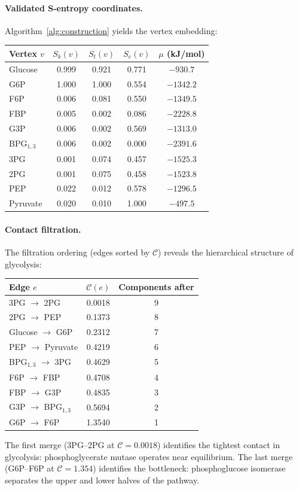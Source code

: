 \documentclass[11pt,twocolumn]{article}
\theoremstyle{plain}
\theoremstyle{definition}
\newcommand{\CC}{\mathcal{C}}
\newcommand{\Sk}{S_k}
\newcommand{\St}{S_t}
\newcommand{\Se}{S_e}
\begin{document}
\paragraph{Validated S-entropy coordinates.}
Algorithm~\ref{alg:construction} yields the vertex embedding:
\begin{center}
\begin{tabular}{lcccc}
\toprule
Vertex $v$ & $\Sk(v)$ & $\St(v)$ & $\Se(v)$ & $\mu$ (kJ/mol) \\
\midrule
Glucose    & 0.999 & 0.921 & 0.771 & $-930.7$ \\
G6P        & 1.000 & 1.000 & 0.554 & $-1342.2$ \\
F6P        & 0.006 & 0.081 & 0.550 & $-1349.5$ \\
FBP        & 0.005 & 0.002 & 0.086 & $-2228.8$ \\
G3P        & 0.006 & 0.002 & 0.569 & $-1313.0$ \\
BPG$_{1,3}$ & 0.006 & 0.002 & 0.000 & $-2391.6$ \\
3PG        & 0.001 & 0.074 & 0.457 & $-1525.3$ \\
2PG        & 0.001 & 0.075 & 0.458 & $-1523.8$ \\
PEP        & 0.022 & 0.012 & 0.578 & $-1296.5$ \\
Pyruvate   & 0.020 & 0.010 & 1.000 & $-497.5$ \\
\bottomrule
\end{tabular}
\end{center}

\paragraph{Contact filtration.}
The filtration ordering (edges sorted by $\CC$) reveals the hierarchical
structure of glycolysis:
\begin{center}
\begin{tabular}{lcc}
\toprule
Edge $e$ & $\CC(e)$ & Components after \\
\midrule
3PG $\to$ 2PG       & 0.0018 & 9 \\
2PG $\to$ PEP       & 0.1373 & 8 \\
Glucose $\to$ G6P   & 0.2312 & 7 \\
PEP $\to$ Pyruvate  & 0.4219 & 6 \\
BPG$_{1,3}$ $\to$ 3PG & 0.4629 & 5 \\
F6P $\to$ FBP       & 0.4708 & 4 \\
FBP $\to$ G3P       & 0.4835 & 3 \\
G3P $\to$ BPG$_{1,3}$ & 0.5694 & 2 \\
G6P $\to$ F6P       & 1.3540 & 1 \\
\bottomrule
\end{tabular}
\end{center}
The first merge (3PG--2PG at $\CC = 0.0018$) identifies the tightest contact
in glycolysis: phosphoglycerate mutase operates near equilibrium. The last
merge (G6P--F6P at $\CC = 1.354$) identifies the bottleneck: phosphoglucose
isomerase separates the upper and lower halves of the pathway.
\end{document}
